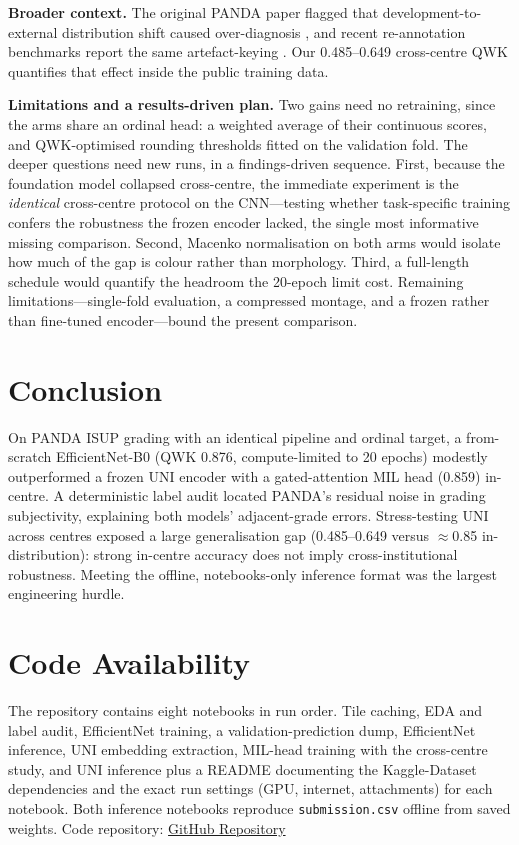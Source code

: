\documentclass[conference]{IEEEtran}
\begin{document}
\textbf{Broader context.} The original PANDA paper flagged that
development-to-external distribution shift caused over-diagnosis \cite{bulten}, and
recent re-annotation benchmarks report the same artefact-keying \cite{pandaplus}.
Our 0.485--0.649 cross-centre QWK quantifies that effect inside the public training
data.

\textbf{Limitations and a results-driven plan.} Two gains need no retraining, since
the arms share an ordinal head: a weighted average of their continuous scores, and
QWK-optimised rounding thresholds fitted on the validation fold. The deeper
questions need new runs, in a findings-driven sequence. First, because the
foundation model collapsed cross-centre, the immediate experiment is the
\emph{identical} cross-centre protocol on the CNN---testing whether task-specific
training confers the robustness the frozen encoder lacked, the single most
informative missing comparison. Second, Macenko normalisation on both arms would
isolate how much of the gap is colour rather than morphology. Third, a full-length
schedule would quantify the headroom the 20-epoch limit cost. Remaining
limitations---single-fold evaluation, a compressed montage, and a frozen rather than
fine-tuned encoder---bound the present comparison.

\section{Conclusion}
On PANDA ISUP grading with an identical pipeline and ordinal target, a from-scratch
EfficientNet-B0 (QWK 0.876, compute-limited to 20 epochs) modestly outperformed a
frozen UNI encoder with a gated-attention MIL head (0.859) in-centre. A deterministic
label audit located PANDA's residual noise in grading subjectivity, explaining both
models' adjacent-grade errors. Stress-testing UNI across centres exposed a large
generalisation gap (0.485--0.649 versus $\approx$0.85 in-distribution): strong
in-centre accuracy does not imply cross-institutional robustness. Meeting the
offline, notebooks-only inference format was the largest engineering hurdle.

\section*{Code Availability}
The repository
contains eight notebooks in run order. Tile caching, EDA and label audit,
EfficientNet training, a validation-prediction dump, EfficientNet inference, UNI
embedding extraction, MIL-head training with the cross-centre study, and UNI
inference plus a README documenting the Kaggle-Dataset dependencies and the exact
run settings (GPU, internet, attachments) for each notebook. Both inference
notebooks reproduce \texttt{submission.csv} offline from saved weights. Code repository:
\href{https://github.com/Shashaboii/AIMI_Panda_Challenge}{GitHub Repository}
\end{document}
